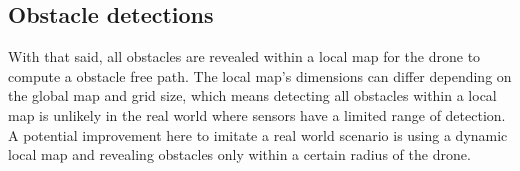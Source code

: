 \subsection{Obstacle detections}
With that said, all obstacles are revealed within a local map for the drone to compute a obstacle free path. The local map's dimensions can differ depending on the global map and grid size, which means detecting all obstacles within a local map is unlikely in the real world where sensors have a limited range of detection. \\
 A potential improvement here to imitate a real world scenario is using a dynamic local map and revealing obstacles only within a certain radius of the drone.

